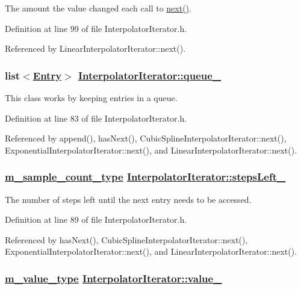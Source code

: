 The amount the value changed each call to \hyperlink{classInterpolatorIterator_a4}{next()}. 

Definition at line 99 of file Interpolator\-Iterator.h.

Referenced by Linear\-Interpolator\-Iterator::next().\hypertarget{classInterpolatorIterator_p0}{
\subsubsection[queue\_\-]{\setlength{\rightskip}{0pt plus 5cm}list$<$\hyperlink{classInterpolatorIterator_1_1Entry}{Entry}$>$ \hyperlink{classInterpolatorIterator_p0}{Interpolator\-Iterator::queue\_\-}}}
\label{classInterpolatorIterator_p0}


This class works by keeping entries in a queue. 

Definition at line 83 of file Interpolator\-Iterator.h.

Referenced by append(), has\-Next(), Cubic\-Spline\-Interpolator\-Iterator::next(), Exponential\-Interpolator\-Iterator::next(), and Linear\-Interpolator\-Iterator::next().\hypertarget{classInterpolatorIterator_p1}{
\subsubsection[stepsLeft\_\-]{\setlength{\rightskip}{0pt plus 5cm}\hyperlink{Types_8h_a1}{m\_\-sample\_\-count\_\-type} \hyperlink{classInterpolatorIterator_p1}{Interpolator\-Iterator::steps\-Left\_\-}}}
\label{classInterpolatorIterator_p1}


The number of steps left until the next entry needs to be accessed. 

Definition at line 89 of file Interpolator\-Iterator.h.

Referenced by has\-Next(), Cubic\-Spline\-Interpolator\-Iterator::next(), Exponential\-Interpolator\-Iterator::next(), and Linear\-Interpolator\-Iterator::next().\hypertarget{classInterpolatorIterator_p2}{
\subsubsection[value\_\-]{\setlength{\rightskip}{0pt plus 5cm}\hyperlink{Types_8h_a3}{m\_\-value\_\-type} \hyperlink{classInterpolatorIterator_p2}{Interpolator\-Iterator::value\_\-}}}
\label{classInterpolatorIterator_p2}



